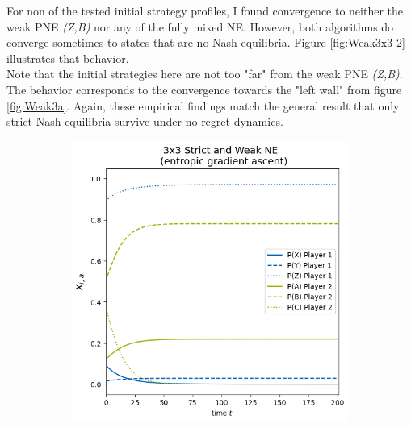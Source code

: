 For non of the tested initial strategy profiles, I found convergence to neither the weak PNE \textit{(Z,B)} nor any of the fully mixed NE. However, both algorithms do converge sometimes to states that are no Nash equilibria. Figure \ref{fig:Weak3x3-2} illustrates that behavior. \\ 

Note that the initial strategies here are not too "far" from the weak PNE \textit{(Z,B)}. The behavior corresponds to the convergence towards the "left wall" from figure \ref{fig:Weak3a}. Again, these empirical findings match the general result that only strict Nash equilibria survive under no-regret dynamics.  

\begin{figure}[H]
\captionsetup{justification=centering}
\centering
\begin{subfigure}{.5\textwidth}
    \centering
    \includegraphics[width=\textwidth]{logos/Weak3x3-2a.png}
\end{subfigure}%
\begin{subfigure}{.5\textwidth}
    \centering

\end{subfigure}
\end{figure}
